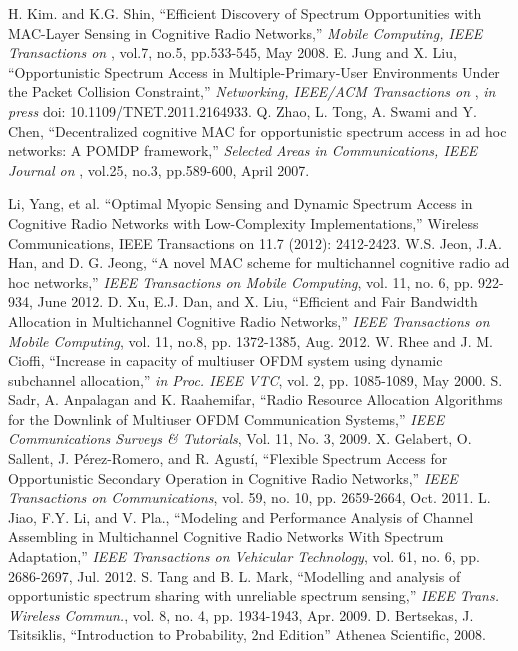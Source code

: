 \begin{thebibliography}{1}
 H. Kim. and K.G. Shin, ``Efficient Discovery of Spectrum Opportunities with MAC-Layer Sensing in Cognitive Radio Networks,'' \emph{Mobile Computing, IEEE Transactions on }, vol.7, no.5, pp.533-545, May 2008.
 E. Jung and X. Liu, ``Opportunistic Spectrum Access in Multiple-Primary-User Environments Under the Packet Collision Constraint,'' \emph{Networking, IEEE/ACM Transactions on }, \textit{in press} doi: 10.1109/TNET.2011.2164933.
 Q. Zhao, L. Tong, A. Swami and Y. Chen, ``Decentralized cognitive MAC for opportunistic spectrum access in ad hoc networks: A POMDP framework,'' \emph{Selected Areas in Communications, IEEE Journal on }, vol.25, no.3, pp.589-600, April 2007.

 Li, Yang, et al. ``Optimal Myopic Sensing and Dynamic Spectrum Access in Cognitive Radio Networks with Low-Complexity Implementations,'' Wireless Communications, IEEE Transactions on 11.7 (2012): 2412-2423.
 W.S. Jeon, J.A. Han, and D. G. Jeong, ``A novel MAC scheme for multichannel cognitive radio ad hoc networks,'' \emph{IEEE Transactions on Mobile Computing}, vol. 11, no. 6, pp. 922-934, June 2012.
 D. Xu, E.J. Dan, and X. Liu, ``Efficient and Fair Bandwidth Allocation in Multichannel Cognitive Radio Networks,'' \emph{IEEE Transactions on Mobile Computing}, vol. 11, no.8, pp. 1372-1385, Aug. 2012.
 W. Rhee and J. M. Cioffi, ``Increase in capacity of multiuser OFDM
system using dynamic subchannel allocation,'' \emph{in Proc. IEEE VTC}, vol. 2, pp. 1085-1089, May 2000.
 S. Sadr, A. Anpalagan and K. Raahemifar, ``Radio Resource Allocation Algorithms for the Downlink of Multiuser OFDM Communication Systems,'' \emph{IEEE Communications Surveys \& Tutorials}, Vol. 11, No. 3, 2009.
X. Gelabert, O. Sallent, J. Pérez-Romero, and R. Agustí, ``Flexible Spectrum Access for Opportunistic Secondary Operation in Cognitive Radio Networks,'' \emph{IEEE Transactions on Communications}, vol. 59, no. 10, pp. 2659-2664, Oct. 2011.
L. Jiao, F.Y. Li, and V. Pla., ``Modeling and Performance Analysis of Channel Assembling in Multichannel Cognitive Radio Networks With Spectrum Adaptation,'' \emph{IEEE Transactions on Vehicular Technology}, vol. 61, no. 6, pp. 2686-2697, Jul. 2012.
 S. Tang and B. L. Mark, ``Modelling and analysis of opportunistic spectrum sharing with unreliable spectrum sensing,'' \emph{IEEE Trans. Wireless Commun.}, vol. 8, no. 4, pp. 1934-1943, Apr. 2009.
D. Bertsekas, J. Tsitsiklis, ``Introduction to Probability, 2nd Edition'' Athenea Scientific, 2008. 


\end{thebibliography}
